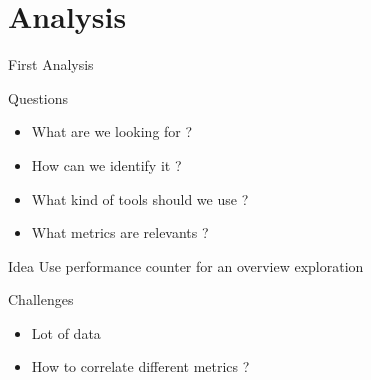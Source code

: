 \documentclass[xcolor={usenames,dvipsnames}]{beamer}
\newcommand{\sectiontitle}{}
\newcommand{\newsection}[1]{\renewcommand{\sectiontitle}{#1}\section{#1}}
\begin{document}
\newsection{Analysis}

\begin{frame}{First Analysis}
    \begin{block}{Questions}
        \begin{itemize}
            \item What are we looking for ?
            \item How can we identify it ?
            \item What kind of tools should we use ?
            \item What metrics are relevants ?
        \end{itemize}
    \end{block}
    \pause
    \begin{alertblock}{Idea}
        Use performance counter for an overview exploration
    \end{alertblock}
    \pause
    \begin{exampleblock}{Challenges}
        \begin{itemize}
            \item Lot of data
            \item How to correlate different metrics ?
        \end{itemize}
    \end{exampleblock}
\end{frame}
\end{document}
